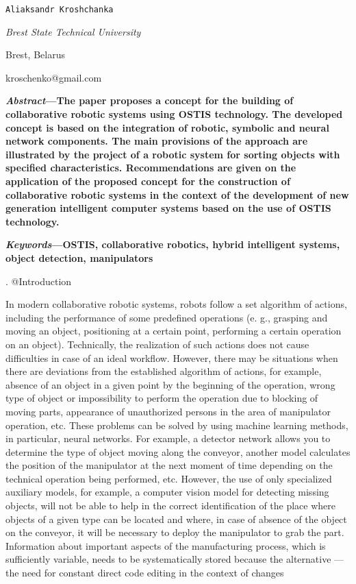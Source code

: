 \documentclass[a4paper]{article}
\makeatletter
\newcommand*{\rom}[1]{\expandafter\@slowromancap\romannumeral #1@}
\makeatother
\begin{document}
\begin{multicols}{2}

\centerline{\texttt{Aliaksandr Kroshchanka}}\par
\centerline{\textit{Brest State Technical University}}
\centerline{Brest, Belarus}
\centerline{kroschenko@gmail.com}
\vspace{10mm}
\footnotesize
\textbf{\textit{Abstract}—The paper proposes a concept for the building
of collaborative robotic systems using OSTIS technology.
The developed concept is based on the integration of robotic,
symbolic and neural network components. The main provisions of the approach are illustrated by the project of
a robotic system for sorting objects with specified characteristics. Recommendations are given on the application of
the proposed concept for the construction of collaborative
robotic systems in the context of the development of new
generation intelligent computer systems based on the use
of OSTIS technology.}\par
\textbf{\textit{Keywords}—OSTIS, collaborative robotics, hybrid intelligent systems, object detection, manipulators}
\vspace{2mm}

\centerline{\rom{1. }\space Introduction}
\vspace{2mm}
\normalsize
In modern collaborative robotic systems, robots follow
a set algorithm of actions, including the performance of
some predefined operations (e. g., grasping and moving
an object, positioning at a certain point, performing a certain operation on an object). Technically, the realization
of such actions does not cause difficulties in case of an
ideal workflow. However, there may be situations when
there are deviations from the established algorithm of
actions, for example, absence of an object in a given point
by the beginning of the operation, wrong type of object
or impossibility to perform the operation due to blocking
of moving parts, appearance of unauthorized persons in
the area of manipulator operation, etc. These problems
can be solved by using machine learning methods, in particular, neural networks. For example, a detector network
allows you to determine the type of object moving along
the conveyor, another model calculates the position of
the manipulator at the next moment of time depending
on the technical operation being performed, etc. However,
the use of only specialized auxiliary models, for example,
a computer vision model for detecting missing objects,
will not be able to help in the correct identification of the
place where objects of a given type can be located and
where, in case of absence of the object on the conveyor,
it will be necessary to deploy the manipulator to grab the
part. Information about important aspects of the manufacturing process, which is sufficiently variable, needs to be
systematically stored because the alternative — the need
for constant direct code editing in the context of changes\par
\columnbreak


\end{multicols}
\end{document}
